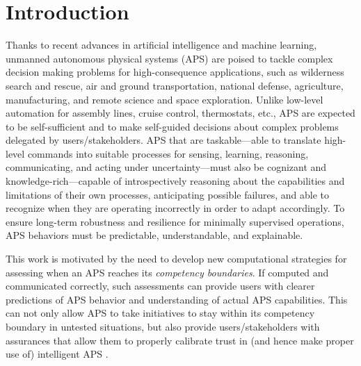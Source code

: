 \section{Introduction}

Thanks to recent advances in artificial intelligence and machine learning, unmanned autonomous physical systems (APS) are poised to tackle complex decision making problems for high-consequence applications, such as wilderness search and rescue, air and ground transportation, national defense, agriculture, manufacturing, and remote science and space exploration. 
Unlike low-level automation for assembly lines, cruise control, thermostats, etc., APS are expected to be self-sufficient and to make self-guided decisions about complex problems delegated by users/stakeholders. APS that are taskable---able to translate high-level commands into suitable processes for sensing, learning, reasoning, communicating, and acting under uncertainty---must also be cognizant and knowledge-rich---capable of introspectively reasoning about the capabilities and limitations of their own processes, anticipating possible failures, and able to recognize when they are operating incorrectly in order to adapt accordingly. To ensure long-term robustness and resilience for minimally supervised operations, APS behaviors must be predictable, understandable, and explainable. %

This work is motivated by the need to develop new computational strategies for assessing when an APS reaches its \emph{competency boundaries}. If computed and communicated correctly, such assessments can provide users with clearer predictions of APS behavior and understanding of actual APS capabilities. This can not only allow APS to take initiatives to stay within its competency boundary in untested situations, but also provide users/stakeholders with assurances that allow them to properly calibrate trust in (and hence make proper use of) intelligent APS \cite{Israelsen2018-es}. 


